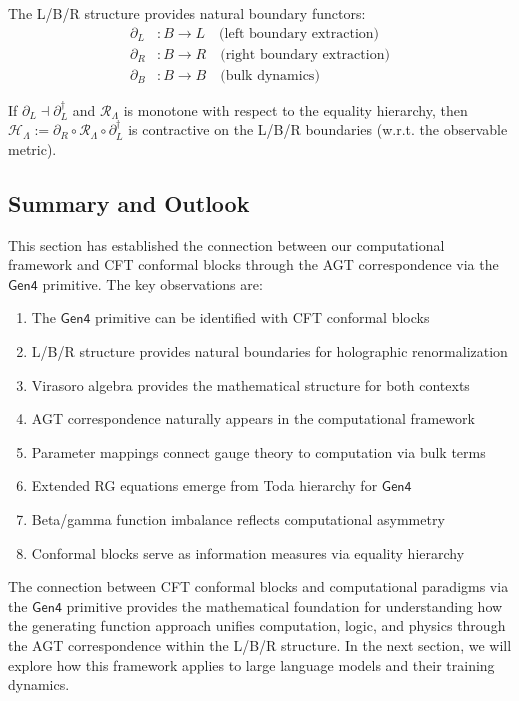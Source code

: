\begin{definition}
\label{def:lbr-boundary-functors}
The L/B/R structure provides natural boundary functors:
\begin{align}
\partial_L &: B \to L \quad \text{(left boundary extraction)} \\
\partial_R &: B \to R \quad \text{(right boundary extraction)} \\
\partial_B &: B \to B \quad \text{(bulk dynamics)}
\end{align}
\end{definition}

\begin{proposition}
\label{prop:lbr-boundary-adjunction}
If $\partial_L \dashv \partial_L^\dagger$ and $\mathcal{R}_\Lambda$ is monotone with respect to the equality hierarchy, then $\mathcal{H}_\Lambda := \partial_R \circ \mathcal{R}_\Lambda \circ \partial_L^\dagger$ is contractive on the L/B/R boundaries (w.r.t. the observable metric).
\end{proposition}

\subsection{Summary and Outlook}

This section has established the connection between our computational framework and CFT conformal blocks through the AGT correspondence via the $\mathsf{Gen4}$ primitive. The key observations are:

\begin{enumerate}
\item The $\mathsf{Gen4}$ primitive can be identified with CFT conformal blocks
\item L/B/R structure provides natural boundaries for holographic renormalization
\item Virasoro algebra provides the mathematical structure for both contexts
\item AGT correspondence naturally appears in the computational framework
\item Parameter mappings connect gauge theory to computation via bulk terms
\item Extended RG equations emerge from Toda hierarchy for $\mathsf{Gen4}$
\item Beta/gamma function imbalance reflects computational asymmetry
\item Conformal blocks serve as information measures via equality hierarchy
\end{enumerate}

The connection between CFT conformal blocks and computational paradigms via the $\mathsf{Gen4}$ primitive provides the mathematical foundation for understanding how the generating function approach unifies computation, logic, and physics through the AGT correspondence within the L/B/R structure. In the next section, we will explore how this framework applies to large language models and their training dynamics.
